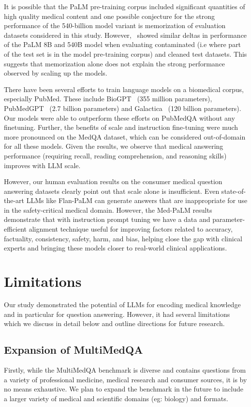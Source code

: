 \documentclass[10pt, letter, onecolumn]{arxiv}
\begin{document}
\begin{refsection}
It is possible that the PaLM pre-training corpus included significant quantities of high quality medical content and one possible conjecture for the strong performance of the 540-billion model variant is memorization of evaluation datasets considered in this study. However,~\citet{chowdhery2022palm} showed similar deltas in performance of the PaLM 8B and 540B model when evaluating contaminated (i.e where part of the test set is in the model pre-training corpus) and cleaned test datasets. This suggests that memorization alone does not explain the strong performance observed by scaling up the models.

There have been several efforts to train language models on a biomedical corpus, especially PubMed. These include BioGPT~\cite{luo2022biogpt} (355 million parameters), PubMedGPT~\cite{bolton2022pubmedgpt} (2.7 billion parameters) and Galactica~\cite{taylor2022galactica} (120 billion parameters). Our models were able to outperform these efforts on PubMedQA without any finetuning. Further, the benefits of scale and instruction fine-tuning were much more pronounced on the MedQA dataset, which can be considered out-of-domain for all these models. Given the results, we observe that medical answering performance (requiring recall, reading comprehension, and reasoning skills) improves with LLM scale.

However, our human evaluation results on the consumer medical question answering datasets clearly point out that scale alone is insufficient. Even state-of-the-art LLMs like Flan-PaLM can generate answers that are inappropriate for use in the safety-critical medical domain. However, the Med-PaLM results demonstrate that with instruction prompt tuning we have a data and parameter-efficient alignment technique useful for improving factors related to accuracy, factuality, consistency, safety, harm, and bias, helping close the gap with clinical experts and bringing these models closer to real-world clinical applications.

\section{Limitations}
\label{sec:limitations}
Our study demonstrated the potential of LLMs for encoding medical knowledge and in particular for question answering. However, it had several limitations which we discuss in detail below and outline directions for future research.

\subsection{Expansion of MultiMedQA}
Firstly, while the MultiMedQA benchmark is diverse and contains questions from a variety of professional medicine, medical research and consumer sources, it is by no means exhaustive. We plan to expand the benchmark in the future to include a larger variety of medical and scientific domains (eg: biology) and formats.


\end{refsection}
\end{document}
